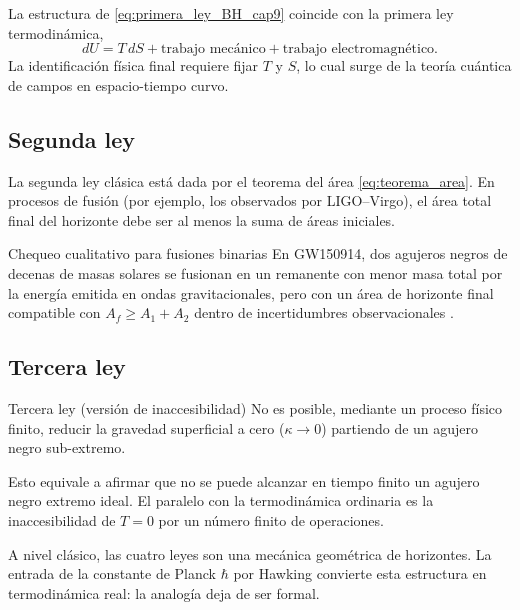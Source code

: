 La estructura de \eqref{eq:primera_ley_BH_cap9} coincide con la primera ley termodinámica,
\begin{equation}
  dU = T\,dS + \text{trabajo mecánico} + \text{trabajo electromagnético}.
\end{equation}
La identificación física final requiere fijar $T$ y $S$, lo cual surge de la teoría cuántica de campos en espacio-tiempo curvo.

\subsection{Segunda ley}

La segunda ley clásica está dada por el teorema del área \eqref{eq:teorema_area}. En procesos de fusión (por ejemplo, los observados por LIGO--Virgo), el área total final del horizonte debe ser al menos la suma de áreas iniciales.

\begin{ejemplo}{Chequeo cualitativo para fusiones binarias}{}
En GW150914, dos agujeros negros de decenas de masas solares se fusionan en un remanente con menor masa total por la energía emitida en ondas gravitacionales, pero con un área de horizonte final compatible con $A_f\ge A_1+A_2$ dentro de incertidumbres observacionales \cite{Abbott2016prl}.
\end{ejemplo}

\subsection{Tercera ley}

\begin{proposicion}{Tercera ley (versión de inaccesibilidad)}{}
No es posible, mediante un proceso físico finito, reducir la gravedad superficial a cero ($\kappa\to0$) partiendo de un agujero negro sub-extremo.
\end{proposicion}

Esto equivale a afirmar que no se puede alcanzar en tiempo finito un agujero negro extremo ideal. El paralelo con la termodinámica ordinaria es la inaccesibilidad de $T=0$ por un número finito de operaciones.

\begin{importante}
A nivel clásico, las cuatro leyes son una mecánica geométrica de horizontes. La entrada de la constante de Planck $\hbar$ por Hawking convierte esta estructura en termodinámica real: la analogía deja de ser formal.
\end{importante}

